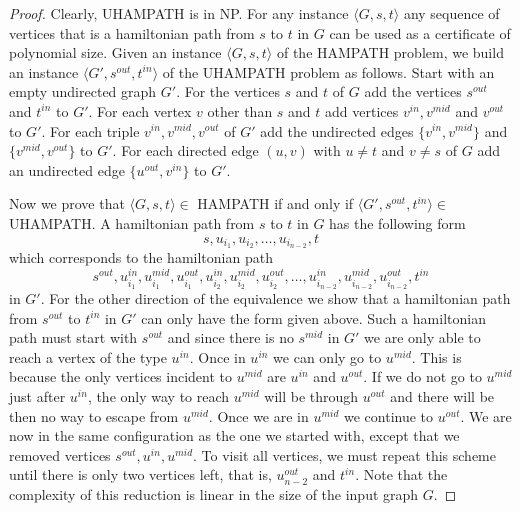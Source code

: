 \documentclass{article}
\begin{document}
\begin{proof}
	Clearly, UHAMPATH is in NP\@. For any instance \(\langle G,s,t\rangle\)
	any sequence of vertices that is a
	hamiltonian path from \(s\) to \(t\) in \(G\) can be used as a certificate
	of polynomial size.
	Given an instance \(\langle G, s, t \rangle\) of the HAMPATH problem, we
	build an instance \(\langle G', s^{out}, t^{in}\rangle\) of the UHAMPATH
	problem as follows. Start with an empty undirected graph \(G'\). For the
	vertices \(s\) and \(t\) of \(G\) add the vertices \(s^{out}\) and
	\(t^{in}\) to \(G'\). For each vertex \(v\) other than \(s\) and \(t\) add
	vertices \(v^{in}, v^{mid}\) and \(v^{out}\) to \(G'\). For each triple
	\(v^{in},v^{mid},v^{out}\) of \(G'\) add the undirected edges \(\{v^{in},
	v^{mid}\}\) and \(\{v^{mid},v^{out}\}\) to \(G'\).
	For each directed
	edge \((u,v)\) with \(u \neq t\) and \(v \neq s\) of \(G\) add an
	undirected
	edge \(\{u^{out},v^{in}\}\) to \(G'\).

	Now we prove that \(\langle G, s, t \rangle \in\) HAMPATH if and only if
	\(\langle G', s^{out}, t^{in}\rangle \in\) UHAMPATH\@. A hamiltonian path from \(s\) to
	\(t\) in \(G\) has the following form
	\begin{displaymath}
		s, u_{i_1}, u_{i_2}, \ldots, u_{i_{n-2}}, t
	\end{displaymath}
	which corresponds to the hamiltonian path
	\begin{displaymath}
		s^{out}, u^{in}_{i_1}, u^{mid}_{i_1}, u^{out}_{i_1}, u^{in}_{i_2},
		u^{mid}_{i_2}, u^{out}_{i_2}, \ldots, u^{in}_{i_{n-2}}, u^{mid}_{i_{n-2}},
		u^{out}_{i_{n-2}}, t^{in}
	\end{displaymath}
	in \(G'\). For the other direction of the equivalence we show that a
	hamiltonian path from \(s^{out}\) to \(t^{in}\) in \(G'\) can only have the
	form given above. Such a hamiltonian path must start with \(s^{out}\) and
	since there is no \(s^{mid}\) in \(G'\) we are only able to reach a vertex
	of the type \(u^{in}\). Once in \(u^{in}\) we can only go to \(u^{mid}\).
	This is because the only vertices incident to \(u^{mid}\) are \(u^{in}\) and
	\(u^{out}\). If we do not go to \(u^{mid}\) just after \(u^{in}\),
	the only way to reach \(u^{mid}\) will be through \(u^{out}\) and there
	will be then no way to escape from \(u^{mid}\). Once we are in \(u^{mid}\)
	we continue to \(u^{out}\). We are now in the same configuration as the one
	we started with, except that we removed vertices
	\(s^{out},u^{in},u^{mid}\). To visit all vertices, we must repeat this
	scheme until there is only two vertices left, that is, \(u^{out}_{n-2}\)
	and \(t^{in}\). Note that the complexity of this reduction is linear in the
	size of the input graph \(G\).
\end{proof}
\end{document}
